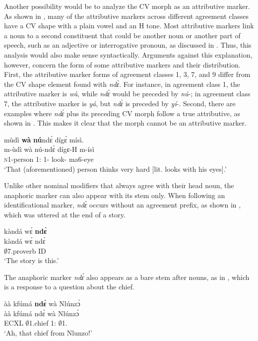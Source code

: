 Another possibility would be to analyze the CV morph as an attributive marker. As shown in , many of the attributive markers across different agreement classes have  a CV shape with a plain vowel and an H tone. Most attributive markers link a noun to a second constituent that could be another noun or another part of speech, such as an adjective or interrogative pronoun, as discussed in . Thus, this analysis would also make sense syntactically. Arguments against this explanation, however, concern the form of some attributive markers and their distribution. First, the attributive marker forms of agreement classes 1, 3, 7, and 9 differ from the CV shape element found with {\itshape ndɛ̀}. For instance, in agreement class 1, the attributive marker is {\itshape wà}, while {\itshape ndɛ̀} would be preceded by {\itshape nú}-; in agreement class 7, the attributive marker is {\itshape yá}, but {\itshape ndɛ̀} is preceded by {\itshape yí}-. Second, there are examples where {\itshape ndɛ̀} plus its preceding CV morph follow a true attributive, as shown in . This makes it clear that the morph cannot be an attributive marker.

\ea \label{ANAnoATT}
  \glll mùdì {\bfseries wà} {\bfseries nú}ndɛ́ dígɛ́ mísì. \\
       m-ùdì wà nú-ndɛ̀ dígɛ-H m-ísì \\
        \textsc{n}1-person 1:{\ATT} 1-{\ANA} look-{\R} ma6-eye \\
    \trans `That (aforementioned) person thinks very hard [lit. looks with his eyes].'
\z



Unlike other nominal modifiers that always agree with their head noun, the anaphoric marker can also appear with its stem only.  When following an identificational marker, {\itshape ndɛ̀} occurs without an agreement prefix, as shown in , which was uttered at the end of a story.


\ea \label{ANA41t}
  \glll kàndá wɛ́ {\bfseries ndɛ̀} \\
        kàndá wɛ́ ndɛ̀ \\
        $\emptyset$7.proverb ID {\ANA}  \\
    \trans `The story is this.'
\z

\noindent The anaphoric marker {\itshape ndɛ́} also appears as a bare stem after nouns, as in , which is a response to a question about the chief.

\ea \label{ANA42t}
  \glll  àà kfúmá {\bfseries ndɛ̀} wà Nlúnzɔ̀ \\
        àà kfúmá ndɛ̀ wà Nlúnzɔ̀ \\
        ECXL $\emptyset$1.chief {\ANA}  1:{\ATT} $\emptyset$1.{\PN}  \\
    \trans `Ah, that chief from Nlunzo!'
\z







